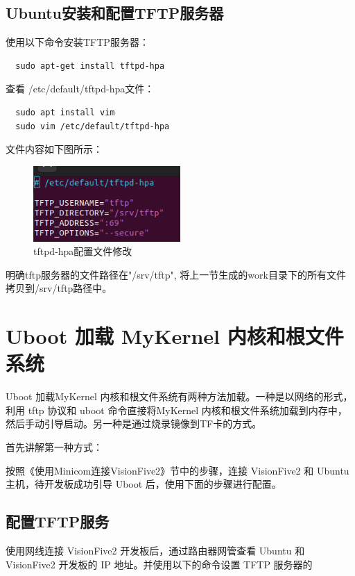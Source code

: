 \documentclass[lang=cn,10pt]{elegantbook}
\begin{document}
\subsection{Ubuntu安装和配置TFTP服务器}
使用以下命令安装TFTP服务器：

\begin{lstlisting}
  sudo apt-get install tftpd-hpa
\end{lstlisting}

查看 /etc/default/tftpd-hpa文件：

\begin{lstlisting}
  sudo apt install vim
  sudo vim /etc/default/tftpd-hpa
\end{lstlisting}

文件内容如下图所示：


\begin{figure}[htbp]
  \centering
  \includegraphics[width=0.5\textwidth]{image/image-20231029162404057.png}
  \caption{tftpd-hpa配置文件修改}
\end{figure}


明确tftp服务器的文件路径在"/srv/tftp", 将上一节生成的work目录下的所有文件拷贝到/srv/tftp路径中。

\section{Uboot 加载 MyKernel 内核和根文件系统}
Uboot 加载MyKernel 内核和根文件系统有两种方法加载。一种是以网络的形式，利用 tftp 协议和 uboot 命令直接将MyKernel 内核和根文件系统加载到内存中，然后手动引导启动。另一种是通过烧录镜像到TF卡的方式。

首先讲解第一种方式：

按照《使用Minicom连接VisionFive2》节中的步骤，连接 VisionFive2 和 Ubuntu 主机，待开发板成功引导 Uboot 后，使用下面的步骤进行配置。

\subsection{配置TFTP服务}

使用网线连接 VisionFive2 开发板后，通过路由器网管查看 Ubuntu 和 VisionFive2 开发板的 IP 地址。并使用以下的命令设置 TFTP 服务器的
\end{document}
